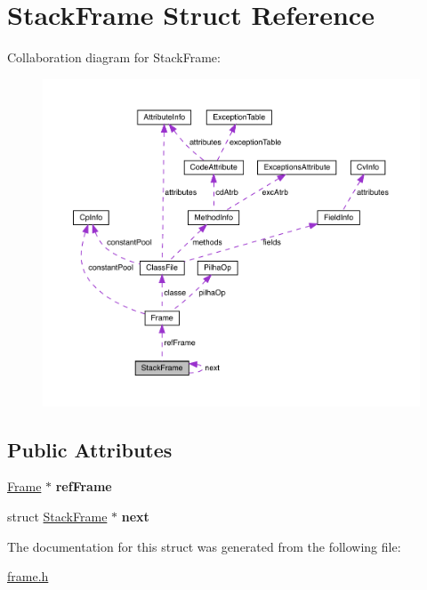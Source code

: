\hypertarget{structStackFrame}{}\section{Stack\+Frame Struct Reference}
\label{structStackFrame}


Collaboration diagram for Stack\+Frame\+:
\nopagebreak
\begin{figure}[H]
\begin{center}
\leavevmode
\includegraphics[width=350pt]{structStackFrame__coll__graph}
\end{center}
\end{figure}
\subsection*{Public Attributes}
\begin{DoxyCompactItemize}
\item 
\mbox{\label{structStackFrame_aee414b80c97dcb5e37632a64bbcbff1c}} 
\mbox{\hyperlink{structFrame}{Frame}} $\ast$ {\bfseries ref\+Frame}
\item 
\mbox{\label{structStackFrame_a3cb6ca230d221991df6c9f554aa7a43b}} 
struct \mbox{\hyperlink{structStackFrame}{Stack\+Frame}} $\ast$ {\bfseries next}
\end{DoxyCompactItemize}


The documentation for this struct was generated from the following file\+:\begin{DoxyCompactItemize}
\item 
\mbox{\hyperlink{frame_8h}{frame.\+h}}\end{DoxyCompactItemize}
